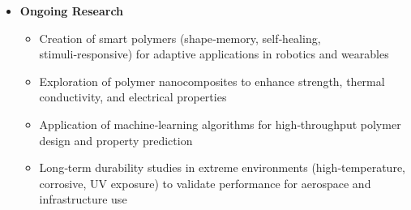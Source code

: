\begin{itemize}
\item \textbf{Ongoing Research}
  \begin{itemize}
\item Creation of smart polymers (shape‑memory, self‑healing, stimuli‑responsive) for adaptive applications in robotics and wearables
\item Exploration of polymer nanocomposites to enhance strength, thermal conductivity, and electrical properties
\item Application of machine‑learning algorithms for high‑throughput polymer design and property prediction
\item Long‑term durability studies in extreme environments (high‑temperature, corrosive, UV exposure) to validate performance for aerospace and infrastructure use
  \end{itemize}
\end{itemize}
